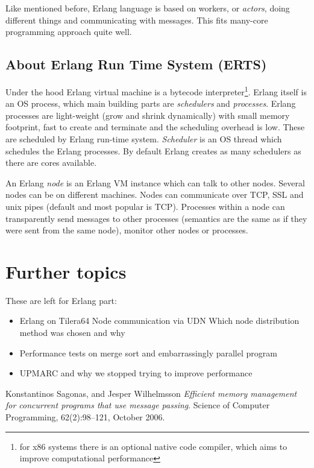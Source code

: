 \documentclass[english,11pt]{article}
\begin{document}
Like mentioned before, Erlang language is based on workers, or {\em actors},
doing different things and communicating with messages. This fits many-core
programming approach quite well.

\subsection{About Erlang Run Time System (ERTS)}

Under the hood Erlang virtual machine is a bytecode interpreter\footnote{for
x86 systems there is an optional native code compiler, which aims to improve
computational performance\cite{hipe}}. Erlang itself is an OS process, which
main building parts are {\em schedulers} and {\em processes}. Erlang processes
are light-weight (grow and shrink dynamically) with small memory footprint,
fast to create and terminate and the scheduling overhead is low. These are
scheduled by Erlang run-time system. {\em Scheduler} is an OS thread which
schedules the Erlang processes. By default Erlang creates as many schedulers as
there are cores available.

An Erlang {\em node} is an Erlang VM instance which can talk to other nodes.
Several nodes can be on different machines. Nodes can communicate over TCP, SSL
and unix pipes (default and most popular is TCP). Processes within a node can
transparently send messages to other processes (semantics are the same as if
they were sent from the same node), monitor other nodes or processes.

\section{Further topics}

These are left for Erlang part:
\begin{itemize}
    \item Erlang on Tilera64
        \subitem Node communication via UDN
        \subitem Which node distribution method was chosen and why
    \item Performance tests on merge sort and embarrassingly parallel program
    \item UPMARC and why we stopped trying to improve performance
\end{itemize}


\clearpage
\begin{thebibliography}{9}

     Konstantinos Sagonas, and Jesper Wilhelmsson \emph{Efficient
    memory management for concurrent programs that use message passing}.
    Science of Computer Programming, 62(2):98--121, October 2006.

\end{thebibliography}
\end{document}
